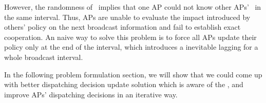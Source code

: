 However, the randomness of \brdelay~implies that one AP could not know other APs' \brdelay~in the same interval.
Thus, APs are unable to evaluate the impact introduced by others' policy on the next broadcast information and fail to establish exact cooperation.
An naive way to solve this problem is to force all APs update their policy only at the end of the interval, which introduces a inevitable lagging for a whole broadcast interval.

In the following problem formulation section, we will show that we could come up with better dispatching decision update solution which is aware of the \brdelay, and improve APs' dispatching decisions in an iterative way.

